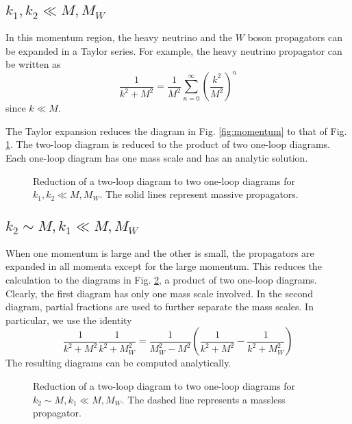 \subsection{$k_{1},k_{2} \ll M, M_{W}$}

In this momentum region, the heavy neutrino and the $W$ boson
propagators can be expanded in a Taylor series.  For example, the
heavy neutrino propagator can be written as
%
\begin{equation}
\frac{1}{k^{2}+M^{2}}
    =
\frac{1}{M^{2}}
    \sum_{n=0}^{\infty}
    \left(
        \frac{k^{2}}{M^{2}}
    \right)^{n}
\end{equation}
%
since $k \ll M$.

The Taylor expansion reduces the diagram in Fig.
\ref{fig:momentum} to that of Fig. \ref{fig:smallk}.  The two-loop
diagram is reduced to the product of two one-loop diagrams. Each
one-loop diagram has one mass scale and has an analytic solution.
%
%
\begin{figure}[htb]
\begin{center}
\epsfxsize=45mm  \caption{Reduction of a
two-loop diagram to two one-loop diagrams for $k_{1}, k_{2} \ll M,
M_{W}$.  The solid lines represent massive propagators.}
\label{fig:smallk}
\end{center}
\end{figure}
%
%
\subsection{$ k_{2} \sim M, k_{1} \ll M, M_{W} $}

When one momentum is large and the other is small, the propagators
are expanded in all momenta except for the large momentum.  This
reduces the calculation to the diagrams in Fig.
\ref{fig:1large_1small}, a product of two one-loop diagrams.
Clearly, the first diagram has only one mass scale involved.  In
the second diagram, partial fractions are used to further separate
the mass scales.  In particular, we use the identity
%
%
\begin{equation}
\frac{1}{k^{2}+M^{2}} \frac{1}{k^{2}+M_{W}^{2}}
    =
\frac{1}{M_{W}^{2}-M^{2}} \left(
    \frac{1}{k^{2}+M^{2}}
    -
    \frac{1}{k^{2}+M_{W}^{2}}
\right)
\end{equation}
%
%
The resulting diagrams can be computed analytically.
%
%
\begin{figure}[htb]
\begin{center}
\epsfxsize=45mm  \caption{Reduction
of a two-loop diagram to two one-loop diagrams for $ k_{2} \sim M,
k_{1} \ll M,M_{W} $.  The dashed line represents a massless
propagator.} \label{fig:1large_1small}
\end{center}
\end{figure}
%
%

